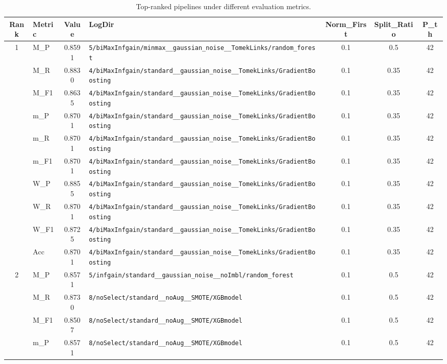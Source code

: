 \begin{table}[htbp]
\caption{Top-ranked pipelines under different evaluation metrics.}
\label{tab:rank_metric_vertical}
\centering
\small
\setlength{\tabcolsep}{4pt}
\begin{tabular}{|c|l|c|>{\ttfamily\footnotesize}p{7.2cm}|c|c|c|}
\hline
Rank & Metric & Value & LogDir & Norm\_First & Split\_Ratio & P\_th \\
\hline
\multirow{10}{*}{1} & M\_P & 0.8591 & \texttt{5/biMaxInfgain/minmax\_\_gaussian\_noise\_\_TomekLinks/random\_forest} & 0.1 & 0.5  & 42 \\ 
 & M\_R & 0.8830 & \texttt{4/biMaxInfgain/standard\_\_gaussian\_noise\_\_TomekLinks/GradientBoosting} & 0.1 & 0.35  & 42 \\ 
 & M\_F1 & 0.8635 & \texttt{4/biMaxInfgain/standard\_\_gaussian\_noise\_\_TomekLinks/GradientBoosting} & 0.1 & 0.35  & 42 \\ 
 & m\_P & 0.8701 & \texttt{4/biMaxInfgain/standard\_\_gaussian\_noise\_\_TomekLinks/GradientBoosting} & 0.1 & 0.35  & 42 \\ 
 & m\_R & 0.8701 & \texttt{4/biMaxInfgain/standard\_\_gaussian\_noise\_\_TomekLinks/GradientBoosting} & 0.1 & 0.35  & 42 \\ 
 & m\_F1 & 0.8701 & \texttt{4/biMaxInfgain/standard\_\_gaussian\_noise\_\_TomekLinks/GradientBoosting} & 0.1 & 0.35  & 42 \\ 
 & W\_P & 0.8855 & \texttt{4/biMaxInfgain/standard\_\_gaussian\_noise\_\_TomekLinks/GradientBoosting} & 0.1 & 0.35  & 42 \\ 
 & W\_R & 0.8701 & \texttt{4/biMaxInfgain/standard\_\_gaussian\_noise\_\_TomekLinks/GradientBoosting} & 0.1 & 0.35  & 42 \\ 
 & W\_F1 & 0.8725 & \texttt{4/biMaxInfgain/standard\_\_gaussian\_noise\_\_TomekLinks/GradientBoosting} & 0.1 & 0.35  & 42 \\ 
 & Acc & 0.8701 & \texttt{4/biMaxInfgain/standard\_\_gaussian\_noise\_\_TomekLinks/GradientBoosting} & 0.1 & 0.35  & 42 \\ 
\hline
\multirow{10}{*}{2} & M\_P & 0.8571 & \texttt{5/infgain/standard\_\_gaussian\_noise\_\_noImbl/random\_forest} & 0.1 & 0.5  & 42 \\ 
 & M\_R & 0.8730 & \texttt{8/noSelect/standard\_\_noAug\_\_SMOTE/XGBmodel} & 0.1 & 0.5  & 42 \\ 
 & M\_F1 & 0.8507 & \texttt{8/noSelect/standard\_\_noAug\_\_SMOTE/XGBmodel} & 0.1 & 0.5  & 42 \\ 
 & m\_P & 0.8571 & \texttt{8/noSelect/standard\_\_noAug\_\_SMOTE/XGBmodel} & 0.1 & 0.5  & 42 \\ 

\end{tabular}
\end{table}
